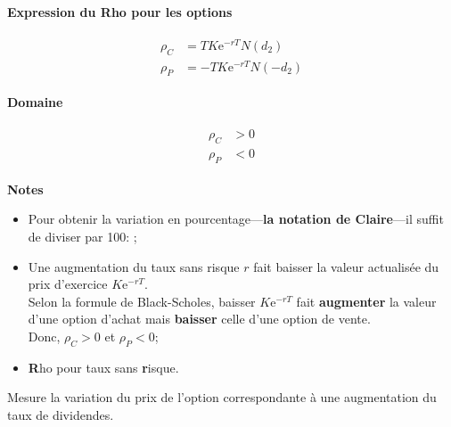 \documentclass[10pt, french]{article}
\begin{document}
\begin{multicols*}{2}
\begin{definitionNOHFILL}[Rho $\rho	=	\deriv{r}{V}$]
\begin{minipage}[ht]{0.5\linewidth}
\begin{center}
	\textbf{Expression du Rho pour les options}
\end{center}
\begin{gather}
\begin{align*}
	\rho_{C}
	&=	T K \textrm{e}^{-r T} N(d_{2})	\\
	\rho_{P}
	&=	-T K \textrm{e}^{-r T} N(-d_{2})
\end{align*}
\end{gather}
\end{minipage}
\begin{minipage}[ht]{0.5\linewidth}
\begin{center}
	\textbf{Domaine}
\end{center}
\begin{gather}
\begin{align*}
	\rho_{C}	&>	0	\\
	\rho_{P}	&<	0
\end{align*}
\end{gather}
\end{minipage}


\tcbline

\begin{center}
	\textbf{Notes}
\end{center}
\begin{itemize}[leftmargin = *]
	\item	Pour obtenir la variation en pourcentage---\textbf{la notation de Claire}---il suffit de diviser par 100: ;
	\item	Une augmentation du taux sans risque $r$ fait baisser la valeur actualisée du prix d'exercice $K\textrm{e}^{-rT}$.\\
			Selon la formule de Black-Scholes, baisser $K\textrm{e}^{-rT}$ fait \textbf{augmenter} la valeur d'une option d'achat mais \textbf{baisser} celle d'une option de vente.\\
			Donc, $\rho_{C} > 0$ et $\rho_{P} < 0$;
	\item	\textbf{R}ho pour taux sans \textbf{r}isque.
\end{itemize}
\end{definitionNOHFILL}

\begin{definitionNOHFILL}[Psi $\psi	=	\deriv{\delta}{V}$]
Mesure la variation du prix de l'option correspondante à une augmentation du taux de dividendes.

\tcbline



\end{definitionNOHFILL}
\end{multicols*}
\end{document}
